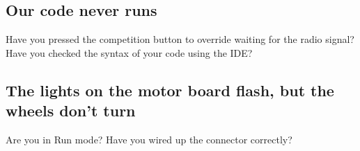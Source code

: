 \documentclass[a4paper, 12pt]{article}
\begin{document}
\subsection{Our code never runs}
Have you pressed the competition button to override waiting for the radio signal? Have you checked the syntax of your code using the IDE?

\subsection{The lights on the motor board flash, but the wheels don't turn}
Are you in Run mode? Have you wired up the connector correctly?
\end{document}
